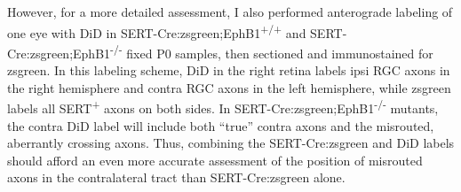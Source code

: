 However, for a more detailed assessment, I also performed anterograde labeling of one eye with DiD in SERT-Cre:zsgreen;EphB1\textsuperscript{+/+} and SERT-Cre:zsgreen;EphB1\textsuperscript{-/-} fixed P0 samples, then sectioned and immunostained for zsgreen.
In this labeling scheme, DiD in the right retina labels ipsi RGC axons in the right hemisphere and contra RGC axons in the left hemisphere, while zsgreen labels all SERT\textsuperscript{+} axons on both sides.
In SERT-Cre:zsgreen;EphB1\textsuperscript{-/-} mutants, the contra DiD label will include both ``true'' contra axons and the misrouted, aberrantly crossing axons.
Thus, combining the SERT-Cre:zsgreen and DiD labels should afford an even more accurate assessment of the position of misrouted axons in the contralateral tract than SERT-Cre:zsgreen alone.

